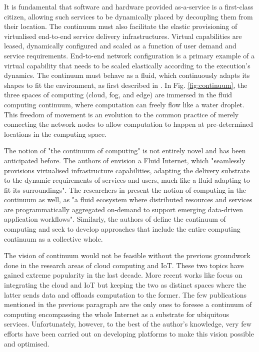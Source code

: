 It is fundamental that software and hardware provided as-a-service is a first-class citizen, allowing such services to be dynamically placed by decoupling them from their location. The continuum must also facilitate the elastic provisioning of virtualised end-to-end service delivery infrastructures. Virtual capabilities are leased, dynamically configured and scaled as a function of user demand and service requirements. End-to-end network configuration is a primary example of a virtual capability that needs to be scaled elastically according to the execution's dynamics. The continuum must behave as a fluid, which continuously adapts its shapes to fit the environment, as first described in \cite{latre2014fluid}. In Fig. \ref{fig:continuum}, the three spaces of computing (cloud, fog, and edge) are immersed in the fluid computing continuum, where computation can freely flow like a water droplet. This freedom of movement is an evolution to the common practice of merely connecting the network nodes to allow computation to happen at pre-determined locations in the computing space.


The notion of "the continuum of computing" is not entirely novel and has been anticipated before. The authors of \cite{latre2014fluid} envision a Fluid Internet, which "seamlessly provisions virtualised infrastructure capabilities, adapting the delivery substrate to the dynamic requirements of services and users, much like a fluid adapting to fit its surroundings". The researchers in \cite{abdelbaky2017computing} present the notion of computing in the continuum as well, as "a fluid ecosystem where distributed resources and services are programmatically aggregated on-demand to support emerging data-driven application workflows". Similarly, the authors of \cite{beckman2020harnessing} define the continuum of computing and seek to develop approaches that include the entire computing continuum as a collective whole.

The vision of continuum would not be feasible without the previous groundwork done in the research areas of cloud computing and IoT. These two topics have gained extreme popularity in the last decade. More recent works like \cite{botta2016integration} focus on integrating the cloud and IoT but keeping the two as distinct spaces where the latter sends data and offloads computation to the former. The few publications mentioned in the previous paragraph are the only ones to foresee a continuum of computing encompassing the whole Internet as a substrate for ubiquitous services. Unfortunately, however, to the best of the author's knowledge, very few efforts have been carried out on developing platforms to make this vision possible and optimised.

